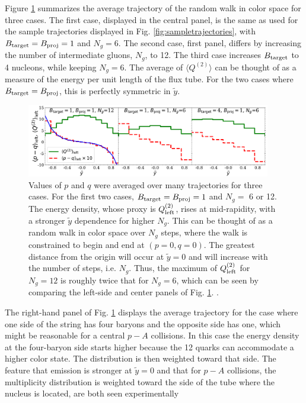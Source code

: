 \documentclass[aps, prc, 12pt, nofootinbib, showpacs, superscriptaddress, tightenlines, groupedaddress]{revtex4-2}
\begin{document}
Figure \ref{fig:averagetrajectory} summarizes the average trajectory of the random walk in color space for three cases. The first case, displayed in the central panel, is the same as used for the sample trajectories displayed in Fig. \ref{fig:sampletrajectories}, with $B_{\rm target}=B_{\rm proj}=1$ and $N_g=6$. The second case, first panel, differs by increasing the number of intermediate gluons, $N_g$, to 12. The third case increases $B_{\rm target}$ to 4 nucleons, while keeping $N_g=6$. The average of $\langle Q^{(2)}\rangle$ can be thought of as a measure of the energy per unit length of the flux tube. For the two cases where $B_{\rm target}=B_{\rm proj}$, this is perfectly symmetric in $\tilde{y}$. 
\begin{figure}
\centerline{\includegraphics[width=0.95\textwidth]{figs/average_trajectory.pdf}}
\caption{\label{fig:averagetrajectory}
Values of $p$ and $q$ were averaged over many trajectories for three cases. For the first two cases, $B_{\rm target}=B_{\rm proj}=1$ and $N_g=$ 6 or 12. The energy density, whose proxy is $Q^{(2)}_{\rm left}$, rises at mid-rapidity, with a stronger $\tilde{y}$ dependence for higher $N_g$. This can be thought of as a random walk in color space over $N_g$ steps, where the walk is constrained to begin and end at $(p=0,q=0)$. The greatest distance from the origin will occur at $\tilde{y}=0$ and will increase with the number of steps, i.e. $N_g$. Thus, the maximum of $Q^{(2)}_{\rm left}$ for $N_g=12$ is roughly twice that for $N_g=6$, which can be seen by comparing the left-side and center panels of Fig. \ref{fig:averagetrajectory}. .
}
\end{figure}
The right-hand panel of Fig. \ref{fig:averagetrajectory} displays the average trajectory for the case where one side of the string has four baryons and the opposite side has one, which might be reasonable for a central $p-A$ collisions. In this case the energy density at the four-baryon side starts higher because the 12 quarks can accommodate a higher color state. The distribution is then weighted toward that side. The feature that emission is stronger at $\tilde{y}=0$ and that for $p-A$ collisions, the multiplicity distribution is weighted toward the side of the tube where the nucleus is located, are both seen experimentally \cite{BRAHMS:2003wwg,PHOBOS:2010eyu,ALICE:2016fbt,ALICE:2013jfw,ALICE:2022imr}
\end{document}
